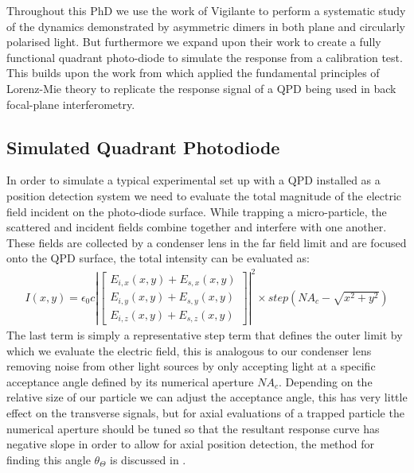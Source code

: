 Throughout this PhD we use the work of Vigilante to perform a systematic study of the dynamics demonstrated by asymmetric dimers in both plane and circularly polarised light. But furthermore we expand upon their work to create a fully functional quadrant photo-diode to simulate the response from a calibration test. This builds upon the work from \cite{Rohrbach2002} which applied the fundamental principles of Lorenz-Mie theory to replicate the response signal of a QPD being used in back focal-plane interferometry.


\subsection{Simulated Quadrant Photodiode}

In order to simulate a typical experimental set up with a QPD installed as a position detection system we need to evaluate the total magnitude of the electric field incident on the photo-diode surface. While trapping a micro-particle, the scattered and incident fields combine together and interfere with one another. These fields are collected by a condenser lens in the far field limit and are focused onto the QPD surface, the total intensity can be evaluated as:
\begin{align}
I(x,y) = \epsilon_0c\left|
\begin{bmatrix} 
	E_{i,x}(x,y)+E_{s,x}(x,y) \\ 
	E_{i,y}(x,y)+E_{s,y}(x,y) \\ 
	E_{i,z}(x,y)+E_{s,z}(x,y)
\end{bmatrix} \right|^2 \times step(NA_c-\sqrt{x^2+y^2})
\end{align}
The last term is simply a representative step term that defines the outer limit by which we evaluate the electric field, this is analogous to our condenser lens removing noise from other light sources by only accepting light at a specific acceptance angle defined by its numerical aperture $NA_c$. Depending on the relative size of our particle we can adjust the acceptance angle, this has very little effect on the transverse signals, but for axial evaluations of a trapped particle the numerical aperture should be tuned so that the resultant response curve has negative slope in order to allow for axial position detection, the method for finding this angle $\theta_\Theta$ is discussed in \cite{Friedrich2012}.

